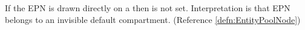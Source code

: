 If the EPN is drawn directly on a  then
   is not set. Interpretation is that  EPN
  belongs to an invisible default compartment.
  (Reference \ref{defn:EntityPoolNode})